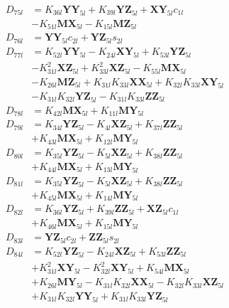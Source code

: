 \begin{align}
D_{75l} &= K_{36l}\mathbf{YY}_{5l} + K_{39l}\mathbf{YZ}_{5l} + \mathbf{XY}_{5l}c_{1l}  \nonumber \\
&- K_{51l}\mathbf{MX}_{5l} - K_{15l}\mathbf{MZ}_{5l} \nonumber \\
D_{76l} &= \mathbf{YY}_{5l}c_{2l} + \mathbf{YZ}_{5l}s_{2l} \nonumber \\
D_{77l} &= K_{52l}\mathbf{YY}_{5l} - K_{24l}\mathbf{XY}_{5l} + K_{53l}\mathbf{YZ}_{5l}  \nonumber \\
&- K_{31l}^2\mathbf{XZ}_{5l} + K_{33l}^2\mathbf{XZ}_{5l} - K_{55l}\mathbf{MX}_{5l}  \nonumber \\
&- K_{26l}\mathbf{MZ}_{5l} + K_{31l}K_{33l}\mathbf{XX}_{5l} + K_{32l}K_{33l}\mathbf{XY}_{5l}  \nonumber \\
&- K_{31l}K_{32l}\mathbf{YZ}_{5l} - K_{31l}K_{33l}\mathbf{ZZ}_{5l} \nonumber \\
D_{78l} &= K_{42l}\mathbf{MX}_{5l} + K_{11l}\mathbf{MY}_{5l} \nonumber \\
D_{79l} &= K_{34l}\mathbf{YZ}_{5l} - K_{4l}\mathbf{XZ}_{5l} + K_{37l}\mathbf{ZZ}_{5l}  \nonumber \\
&+ K_{43l}\mathbf{MX}_{5l} + K_{12l}\mathbf{MY}_{5l} \nonumber \\
D_{80l} &= K_{35l}\mathbf{YZ}_{5l} - K_{5l}\mathbf{XZ}_{5l} + K_{38l}\mathbf{ZZ}_{5l}  \nonumber \\
&+ K_{44l}\mathbf{MX}_{5l} + K_{13l}\mathbf{MY}_{5l} \nonumber \\
D_{81l} &= K_{35l}\mathbf{YZ}_{5l} - K_{5l}\mathbf{XZ}_{5l} + K_{38l}\mathbf{ZZ}_{5l}  \nonumber \\
&+ K_{45l}\mathbf{MX}_{5l} + K_{14l}\mathbf{MY}_{5l} \nonumber \\
D_{82l} &= K_{36l}\mathbf{YZ}_{5l} + K_{39l}\mathbf{ZZ}_{5l} + \mathbf{XZ}_{5l}c_{1l}  \nonumber \\
&+ K_{46l}\mathbf{MX}_{5l} + K_{15l}\mathbf{MY}_{5l} \nonumber \\
D_{83l} &= \mathbf{YZ}_{5l}c_{2l} + \mathbf{ZZ}_{5l}s_{2l} \nonumber \\
D_{84l} &= K_{52l}\mathbf{YZ}_{5l} - K_{24l}\mathbf{XZ}_{5l} + K_{53l}\mathbf{ZZ}_{5l}  \nonumber \\
&+ K_{31l}^2\mathbf{XY}_{5l} - K_{32l}^2\mathbf{XY}_{5l} + K_{54l}\mathbf{MX}_{5l}  \nonumber \\
&+ K_{26l}\mathbf{MY}_{5l} - K_{31l}K_{32l}\mathbf{XX}_{5l} - K_{32l}K_{33l}\mathbf{XZ}_{5l}  \nonumber \\
&+ K_{31l}K_{32l}\mathbf{YY}_{5l} + K_{31l}K_{33l}\mathbf{YZ}_{5l} \nonumber \\

\end{align}
